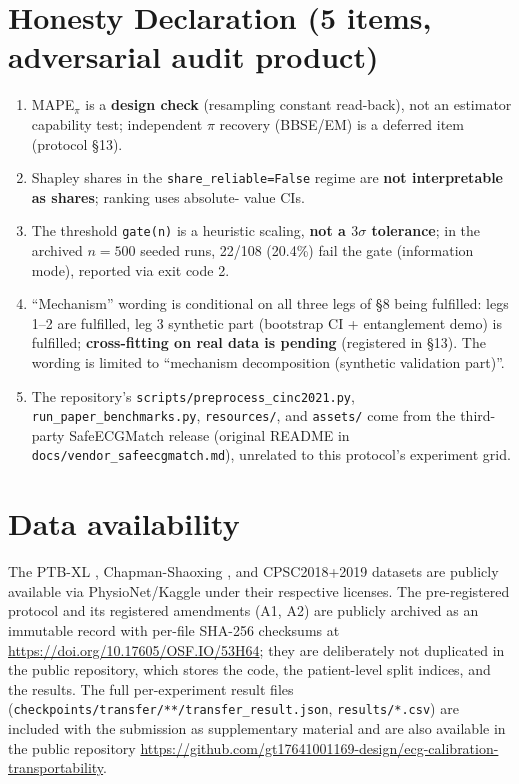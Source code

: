 \documentclass[review,12pt,nonatbib]{elsarticle}
\begin{document}
\section*{Honesty Declaration (5 items, adversarial audit product)}
\label{sec:honesty}
\begin{enumerate}
    \item MAPE$_\pi$ is a \textbf{design check} (resampling constant
    read-back), not an estimator capability test; independent $\pi$
    recovery (BBSE/EM) is a deferred item (protocol \S13).
    \item Shapley shares in the \texttt{share\_reliable=False} regime
    are \textbf{not interpretable as shares}; ranking uses absolute-
    value CIs.
    \item The threshold \texttt{gate(n)} is a heuristic scaling,
    \textbf{not a $3\sigma$ tolerance}; in the archived $n=500$
    seeded runs, 22/108 (20.4\%) fail the gate (information mode),
    reported via exit code 2.
    \item ``Mechanism'' wording is conditional on all three legs of
    \S8 being fulfilled: legs 1--2 are fulfilled, leg 3 synthetic part
    (bootstrap CI + entanglement demo) is fulfilled;
    \textbf{cross-fitting on real data is pending} (registered in
    \S13). The wording is limited to ``mechanism decomposition
    (synthetic validation part)''.
    \item The repository's \texttt{scripts/preprocess\_cinc2021.py},
    \texttt{run\_paper\_benchmarks.py}, \texttt{resources/}, and
    \texttt{assets/} come from the third-party SafeECGMatch release
    (original README in \texttt{docs/vendor\_safeecgmatch.md}),
    unrelated to this protocol's experiment grid.
\end{enumerate}

\section*{Data availability}
The PTB-XL \cite{wagner2020ptbxl}, Chapman-Shaoxing
\cite{zheng2022ecgarrhythmia}, and CPSC2018+2019 datasets are publicly
available via PhysioNet/Kaggle under their respective licenses. The
pre-registered protocol and its registered amendments (A1, A2) are
publicly archived as an immutable record with per-file SHA-256
checksums at \url{https://doi.org/10.17605/OSF.IO/53H64}; they are
deliberately not duplicated in the public repository, which stores the
code, the patient-level split indices, and the results. The full
per-experiment result files
(\texttt{checkpoints/transfer/**/}\allowbreak\texttt{transfer\_result.json},
\texttt{results/*.csv}) are included with the submission as
supplementary material and are also available in the public repository
\url{https://github.com/gt17641001169-design/ecg-calibration-transportability}.
\end{document}
